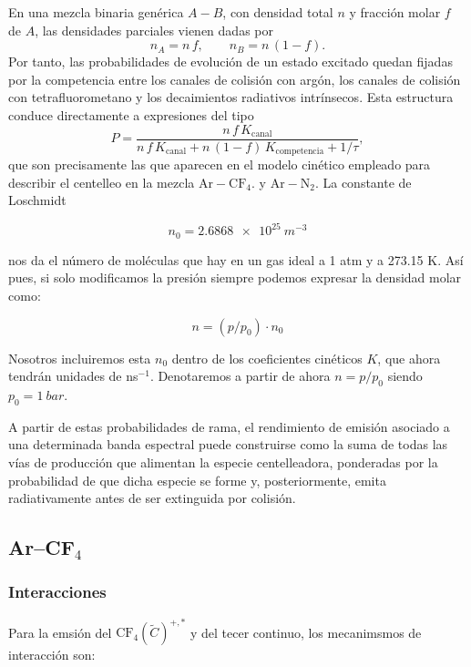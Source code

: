 \documentclass[12pt,a4paper]{article}
\newcommand{\N}{\mathrm{N}}
\newcommand{\Ar}{\mathrm{Ar}}
\newcommand{\CF}{\mathrm{CF}}
\begin{document}
En una mezcla binaria genérica \(A-B\), con densidad total \(n\) y fracción molar \(f\) de \(A\), las densidades parciales vienen dadas por
\begin{equation}
    n_{A}=n\,f,
    \qquad
    n_{B}=n\,(1-f).
\end{equation}
Por tanto, las probabilidades de evolución de un estado excitado quedan fijadas por la competencia entre los canales de colisión con argón, los canales de colisión con tetrafluorometano y los decaimientos radiativos intrínsecos. Esta estructura conduce directamente a expresiones del tipo
\begin{equation}
    P
    =
    \frac{n\,f\,K_{\text{canal}}}
    {n\,f\,K_{\text{canal}}
    +
    n\,(1-f)\,K_{\text{competencia}}
    +
    1/\tau},
    \label{eq:generic_probability_binary_mixture}
\end{equation}
que son precisamente las que aparecen en el modelo cinético empleado para describir el centelleo en la mezcla \(\Ar-\CF_4\). y \(\Ar-\N_2\). La constante de Loschmidt 

$$ n_0 = \SI{2.6868e25}{m^{-3}} $$

nos da el número de moléculas que hay en un gas ideal a 1 atm y a 273.15 K. Así pues, si solo modificamos la presión siempre podemos expresar la densidad molar como:  

$$ n = (p/p_0) \cdot  n_0 $$

Nosotros incluiremos esta $n_0$ dentro de los coeficientes cinéticos $K$, que ahora tendrán unidades de ns$^{-1}$. Denotaremos a partir de ahora $n=p/p_0$ siendo $p_0 = \SI{1}{bar}$.

A partir de estas probabilidades de rama, el rendimiento de emisión asociado a una determinada banda espectral puede construirse como la suma de todas las vías de producción que alimentan la especie centelleadora, ponderadas por la probabilidad de que dicha especie se forme y, posteriormente, emita radiativamente antes de ser extinguida por colisión. 

\subsection{Ar--CF$_4$} \label{subbsec:kinArCF4}

\subsubsection{Interacciones}

Para la emsión del $\CF_4(\tilde{C})^{+,*}$ y del tecer continuo, los mecanimsmos de interacción son:  
\end{document}
